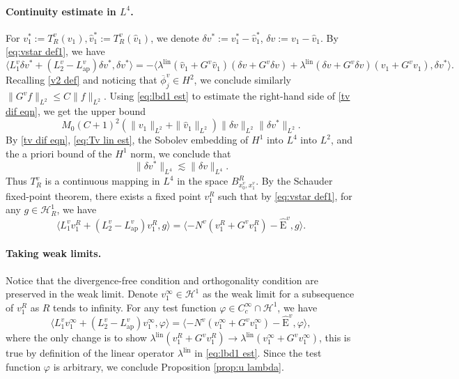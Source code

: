\documentclass[11pt,a4paper]{article}
\numberwithin{equation}{section}
\newcommand{\Epsilon}{\mathrm{E}}
\newcommand{\assign}{:=}
\newcommand{\tmop}[1]{\ensuremath{\operatorname{#1}}}
\begin{document}
\paragraph{Continuity estimate in $L^4$.} For $v_1^{\ast}\assign T_R^v(v_1), \widehat{v}_1^{\ast}\assign T_R^v(\widehat{v}_1)$, we denote $\delta v^{\ast}\assign   v_1^{\ast} - \widehat{v}_1^{\ast}$, $\delta v\assign v_1- \widehat{v}_1$. By \eqref{eq:vstar def1}, we have \begin{equation}
   \langle L_1^v \delta v^{\ast} + (L_2^v -
  L_{\tmop{ap}}^{v}) \delta v^{\ast}, \delta v^{\ast} \rangle =-\langle \lambda^{\text{lin}} (\widehat{v}_1 + G^{v} \widehat{v}_1) (\delta v+G^{v} \delta v) + \lambda^{\text{lin}} (\delta v + G^{v} \delta v) (v_1 + G^{v} v_1), \delta v^{\ast} \rangle .
 \label{tv dif eqn}
\end{equation}
Recalling \eqref{v2 def} and noticing that $\overline\phi^v_j\in H^2$, we conclude similarly $\|G^{v}f\|_{L^2} \leqslant C\|f\|_{L^2} $.
     Using \eqref{eq:lbd1 est} to estimate the right-hand side of \eqref{tv dif eqn}, we get the upper bound $$M_0 (C+1)^2( \|
      v_1 \|_{L^2} +\|
      \widehat{v}_1 \|_{L^2} )\|
      \delta v \|_{L^2} \|
      \delta v^{\ast} \|_{L^2} .$$
      By \eqref{tv dif eqn},  \eqref{eq:Tv lin est}, the Sobolev embedding of $H^1$ into $L^4$ into $L^2$, and the a priori bound of the $H^1$ norm, we conclude that 
\[
\|\delta v^{\ast}\|_{L^4} \lesssim \|\delta v\|_{L^4}.
\]
Thus $T^v_R$ is a continuous mapping in $L^4$ in the space $B^R_{x_0^v, x_1^v}$. By the Schauder fixed-point theorem, there exists a fixed point $v_1^R$ such that by \eqref{eq:vstar def1}, for any $g\in \mathcal{H}^1_R$, we have 
\begin{equation*}  \langle L_1^v v_1^R + (L_2^v - L_{\tmop{ap}}^{v}) v_1^R , g \rangle =  \langle-N^v (v_1^R + G^{v} v_1^R) - \widehat{\Epsilon}^v,g \rangle. \label{eq:vfix def}
\end{equation*}

\paragraph{Taking weak limits.}
Notice that the divergence-free condition and orthogonality condition are preserved in the weak limit.  Denote $v_1^{\infty}\in\mathcal{H}^1$ as the weak limit for a subsequence of $v_1^{R}$ as $R$ tends to infinity. For any test function $\varphi\in C^\infty_c\cap\mathcal{H}^1$, we have 
\[ \langle L_1^v v_1^\infty + (L_2^v - L_{\tmop{ap}}^{v}) v_1^\infty , \varphi \rangle =  \langle-N^v (v_1^\infty + G^{v} v_1^\infty) - \widehat{\Epsilon}^v,\varphi \rangle, \]
where the only change is to show $\lambda^{\text{lin}} (v_1^R + G^{v} v_1^R)\to\lambda^{\text{lin}} (v_1^\infty + G^{v} v_1^\infty)$, this is true by definition of the linear operator $\lambda^{\text{lin}}$ in \eqref{eq:lbd1 est}. Since the test function $\varphi$ is arbitrary, we conclude  Proposition \ref{prop:u lambda}.
\end{document}
